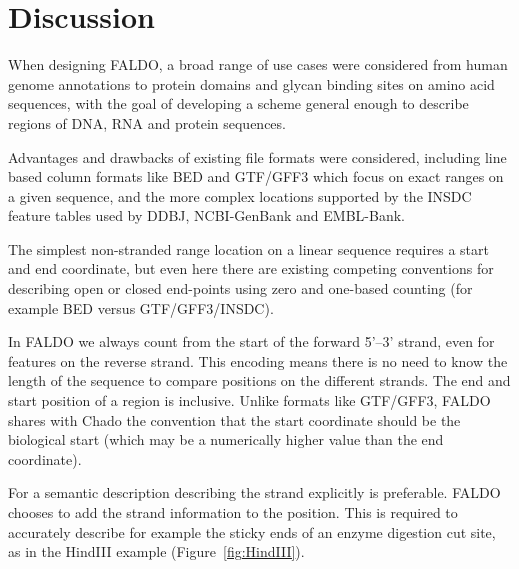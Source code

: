 \section*{Discussion}
When designing FALDO, a broad range of use cases were considered from
human genome annotations to protein domains and glycan binding sites on
amino acid sequences, with the goal of developing a scheme general enough
to describe regions of DNA, RNA and protein sequences.

Advantages and drawbacks of existing file formats were considered, including
line based column formats like BED and GTF/GFF3 which focus on exact
ranges on a given sequence, and the more complex locations supported
by the INSDC feature tables used by DDBJ, NCBI-GenBank and EMBL-Bank.

The simplest non-stranded range location on a linear sequence requires
a start and end coordinate, but even here there are existing competing
conventions for describing open or closed end-points using zero and
one-based counting (for example BED versus GTF/GFF3/INSDC).

In FALDO we always count from the start of the forward 5'--3' strand, even for features on the reverse strand.
This encoding means there is no need to know the length of the sequence to compare positions on the different strands.
The end and start position of a region is inclusive.
Unlike formats like GTF/GFF3, FALDO shares with Chado\cite{Chado2007} the convention
that the start coordinate should be the biological start
(which may be a numerically higher value than the end coordinate).



For a semantic description describing the strand explicitly is preferable.
FALDO chooses to add the strand information to the position. 
This is required to accurately describe for example the sticky ends
of an enzyme digestion cut site, as in the HindIII example (Figure~\ref{fig:HindIII}).

